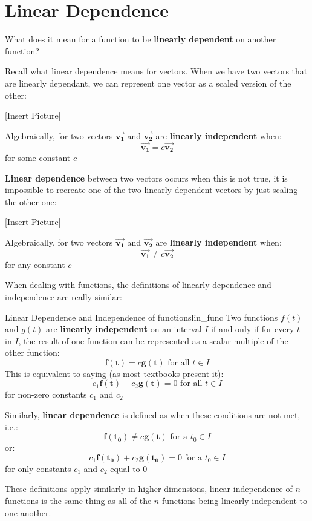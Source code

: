 \documentclass{report}
\begin{document}
\section{Linear Dependence}
What does it mean for a function to be \textbf{linearly dependent} on another function? 

Recall what linear dependence means for vectors. When we have two vectors that are linearly dependant, we can represent one vector as a scaled version of the other:

[Insert Picture]

Algebraically, for two vectors $\bm{\vec{v_1}}$ and $\bm{\vec{v_2}}$ are \textbf{linearly independent} when:
$$\bm{\vec{v_1}} = c\bm{\vec{v_2}}$$
for some constant $c$

\textbf{Linear dependence} between two vectors occurs when this is not true, it is impossible to recreate one of the two linearly dependent vectors by just scaling the other one:

[Insert Picture]

Algebraically, for two vectors $\bm{\vec{v_1}}$ and $\bm{\vec{v_2}}$ are \textbf{linearly independent} when:
$$\bm{\vec{v_1}} \neq c\bm{\vec{v_2}}$$
for any constant $c$

When dealing with functions, the definitions of linearly dependence and independence are really similar:

\begin{mytheo}{Linear Dependence and Independence of functions}{lin_func}
    Two functions $f(t)$ and $g(t)$ are \textbf{linearly independent} on an interval $I$ if and only if for every $t$ in $I$, the result of one function can be represented as a scalar multiple of the other function:
    $$\bm{f(t)} = c\bm{g(t)} \text{ for all $t \in I$}$$
    This is equivalent to saying (as most textbooks present it):
    $$c_1\bm{f(t)} + c_2\bm{g(t)} = 0 \text{ for all $t \in I$}$$
    for non-zero constants $c_1$ and $c_2$
    
    Similarly, \textbf{linear dependence} is defined as when these conditions are not met, i.e.:
    $$\bm{f(t_0)} \neq c\bm{g(t)} \text{ for a $t_0 \in I$}$$
    or:
    $$c_1\bm{f(t_0)} + c_2\bm{g(t_0)} = 0 \text{ for a $t_0 \in I$}$$
    for only constants $c_1$ and $c_2$ equal to 0
    
\end{mytheo}

These definitions apply similarly in higher dimensions, linear independence of $n$ functions is the same thing as all of the $n$ functions being linearly independent to one another.
\end{document}
